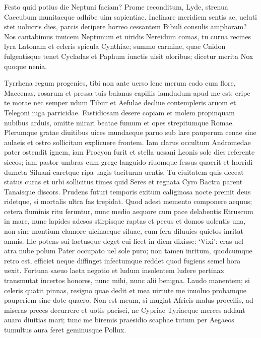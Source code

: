 \documentclass{book}
\newenvironment {carmen} [1] [\relax] 
  {\Titulus \Versus \incipit*\numerus{1}#1}
  {\endVersus}
\newcommand {\Alcaic}    {\Forma \strophae {0 \poena 01 \poena 2}}
\newcommand {\GlycAscl}  {\Forma \strophae {2 \poena 0}}
\begin{document}
\begin{carmen}[\GlycAscl]


     Festo quid potius die
 Neptuni faciam? Prome reconditum,
      Lyde, strenua Caecubum
 munitaeque adhibe uim sapientiae.
      Inclinare meridiem               
 sentis ac, ueluti stet uolucris dies,
      parcis deripere horreo
 cessantem Bibuli consulis amphoram?
      Nos cantabimus inuicem
 Neptunum et uiridis Nereidum comas,               
      tu curua recines lyra
 Latonam et celeris spicula Cynthiae;
      summo carmine, quae Cnidon
 fulgentisque tenet Cycladas et Paphum
      iunctis uisit oloribus;
 dicetur merita Nox quoque nenia.                

\end{carmen}

\begin{carmen}[\Alcaic]


Tyrrhena regum progenies, tibi
 non ante uerso lene merum cado
      cum flore, Maecenas, rosarum et
      pressa tuis balanus capillis 
iamdudum apud me est: eripe te morae     
 nec semper udum Tibur et Aefulae
      decliue contempleris aruom et
      Telegoni iuga parricidae. 
Fastidiosam desere copiam et
 molem propinquam nubibus arduis,               
      omitte mirari beatae
      fumum et opes strepitumque Romae. 
Plerumque gratae diuitibus uices
 mundaeque paruo sub lare pauperum
      cenae sine aulaeis et ostro               
      sollicitam explicuere frontem. 
Iam clarus occultum Andromedae pater
 ostendit ignem, iam Procyon furit
      et stella uesani Leonis
      sole dies referente siccos;                
iam pastor umbras cum grege languido
 riuomque fessus quaerit et horridi
      dumeta Siluani caretque
      ripa uagis taciturna uentis. 
Tu ciuitatem quis deceat status               
 curas et urbi sollicitus times
      quid Seres et regnata Cyro
      Bactra parent Tanaisque discors. 
Prudens futuri temporis exitum
 caliginosa nocte premit deus               
      ridetque, si mortalis ultra
      fas trepidat. Quod adest memento 
componere aequus; cetera fluminis
 ritu feruntur, nunc medio aequore
      cum pace delabentis Etruscum               
      in mare, nunc lapides adesos 
stirpisque raptas et pecus et domos
 uolentis una, non sine montium
      clamore uicinaeque siluae,
      cum fera diluuies quietos                
inritat amnis. Ille potens sui
 laetusque deget cui licet in diem
      dixisse: `Vixi': cras uel atra
      nube polum Pater occupato 
uel sole puro; non tamen inritum,               
 quodcumque retro est, efficiet neque
      diffinget infectumque reddet
      quod fugiens semel hora uexit. 
Fortuna saeuo laeta negotio et
 ludum insolentem ludere pertinax               
      transmutat incertos honores,
      nunc mihi, nunc alii benigna. 
Laudo manentem; si celeris quatit
 pinnas, resigno quae dedit et mea
      uirtute me inuoluo probamque               
      pauperiem sine dote quaero. 
Non est meum, si mugiat Africis
 malus procellis, ad miseras preces
      decurrere et uotis pacisci,
      ne Cypriae Tyriaeque merces                
addant auaro diuitias mari;
 tunc me biremis praesidio scaphae
      tutum per Aegaeos tumultus
      aura feret geminusque Pollux. 


\end{carmen}
\end{document}
